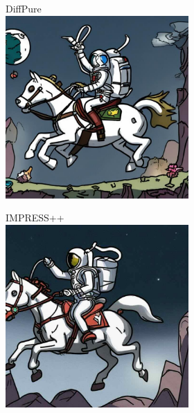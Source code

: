 \documentclass{article}
\begin{document}
\begin{figure}[h]
\begin{subfigure}[t]{\textwidth}
\begin{subfigure}[b]{0.19\textwidth}
     \end{subfigure}
     \hfill
     \begin{subfigure}[b]{0.19\textwidth}
         \centering
         DiffPure\vspace{0.3em}
         \includegraphics[width=\textwidth]{plots/process/generations/glaze/diffpure.jpeg}
     \end{subfigure}
     \hfill
     \begin{subfigure}[b]{0.19\textwidth}
         \centering
         IMPRESS++\vspace{0.3em}
         \includegraphics[width=\textwidth]{plots/process/generations/glaze/impress.jpg}

\end{subfigure}
\end{subfigure}
\end{figure}
\end{document}

